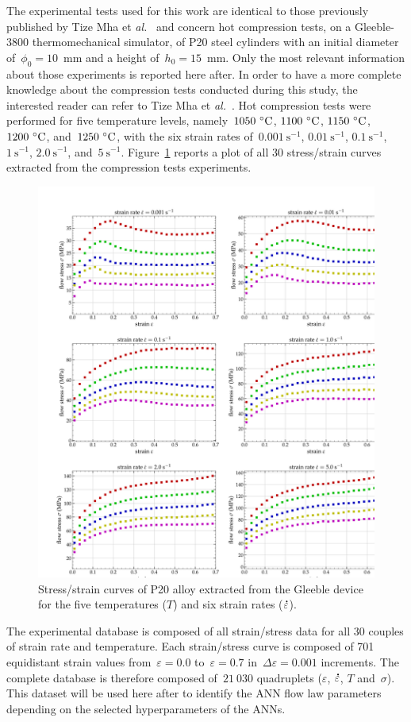 \documentclass[algorithms,article,submit,pdftex,oneauthors]{Definitions/mdpi}
\makeatletter
\DeclareRobustCommand{\mdot}[1]{\accentset{\mbox{\bfseries .}}{#1}}
\DeclareRobustCommand{\eal}{et \emph{al.}\@\xspace}
\DeclareRobustCommand{\ps}{\text{s}^{-1}}
\makeatother
\begin{document}
The experimental tests used for this work are identical to those previously published by Tize Mha \eal~\cite{Tize-2023-IEP} and concern hot compression tests, on a Gleeble-3800 thermomechanical simulator, of P20 steel cylinders with an initial diameter of~$\phi_{0}=10$~mm and a height of~$h_{0}=15$~mm.
Only the most relevant information about those experiments is reported here after.
In order to have a more complete knowledge about the compression tests conducted during this study, the interested reader can refer to Tize Mha \eal~\cite{Tize-2023-IEP}.
Hot compression tests were performed for five temperature levels, namely~$1050~\celsius$, $1100~\celsius$, $1150~\celsius$, $1200~\celsius$, and~$1250~\celsius$, with the six strain rates of~$0.001~\ps$, $0.01~\ps$, $0.1~\ps$, $1~\ps$, $2.0~\ps$, and~$5~\ps$.
Figure~\ref{fig:RawData} reports a plot of all 30 stress/strain curves extracted from the compression tests experiments.
\begin{figure}[h!]
\centering
\includegraphics[width=0.9\columnwidth]{Figures/3Cr2Mo-raw}
\caption{Stress/strain curves of P20 alloy extracted from the Gleeble device for the five temperatures ($T$) and six strain rates ($\mdot{\varepsilon}$).}
\label{fig:RawData}
\end{figure}
The experimental database is composed of all strain/stress data for all 30 couples of strain rate and temperature.
Each strain/stress curve is composed of 701 equidistant strain values from~$\varepsilon=0.0$ to~$\varepsilon=0.7$ in~$\Delta\varepsilon=0.001$ increments.
The complete database is therefore composed of~$21~030$ quadruplets ($\varepsilon$, $\mdot{\varepsilon}$, $T$ and~$\sigma$).
This dataset will be used here after to identify the ANN flow law parameters depending on the selected hyperparameters of the ANNs.
\end{document}
